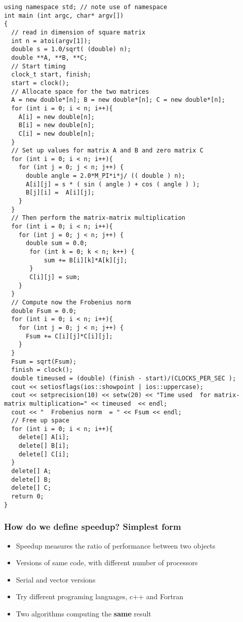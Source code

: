\documentclass{beamer}
\begin{document}
\begin{frame}
\begin{verbatim}
using namespace std; // note use of namespace
int main (int argc, char* argv[])
{
  // read in dimension of square matrix
  int n = atoi(argv[1]);
  double s = 1.0/sqrt( (double) n);
  double **A, **B, **C;
  // Start timing
  clock_t start, finish;
  start = clock();
  // Allocate space for the two matrices
  A = new double*[n]; B = new double*[n]; C = new double*[n];
  for (int i = 0; i < n; i++){
    A[i] = new double[n];
    B[i] = new double[n];
    C[i] = new double[n];
  }
  // Set up values for matrix A and B and zero matrix C
  for (int i = 0; i < n; i++){
    for (int j = 0; j < n; j++) {
      double angle = 2.0*M_PI*i*j/ (( double ) n);
      A[i][j] = s * ( sin ( angle ) + cos ( angle ) );
      B[j][i] =  A[i][j];
    }
  }
  // Then perform the matrix-matrix multiplication
  for (int i = 0; i < n; i++){
    for (int j = 0; j < n; j++) {
      double sum = 0.0;
       for (int k = 0; k < n; k++) {
           sum += B[i][k]*A[k][j];
       }
       C[i][j] = sum;
    }
  }
  // Compute now the Frobenius norm
  double Fsum = 0.0;
  for (int i = 0; i < n; i++){
    for (int j = 0; j < n; j++) {
      Fsum += C[i][j]*C[i][j];
    }
  }
  Fsum = sqrt(Fsum);
  finish = clock();
  double timeused = (double) (finish - start)/(CLOCKS_PER_SEC );
  cout << setiosflags(ios::showpoint | ios::uppercase);
  cout << setprecision(10) << setw(20) << "Time used  for matrix-matrix multiplication=" << timeused  << endl;
  cout << "  Frobenius norm  = " << Fsum << endl;
  // Free up space
  for (int i = 0; i < n; i++){
    delete[] A[i];
    delete[] B[i];
    delete[] C[i];
  }
  delete[] A;
  delete[] B;
  delete[] C;
  return 0;
}

\end{verbatim}
\end{frame}

\begin{frame}
\frametitle{How do we define speedup? Simplest form}

\begin{block}{}
\begin{itemize}
\item Speedup measures the ratio of performance between two objects

\item Versions of same code, with different number of processors

\item Serial and vector versions

\item Try different programing languages, c++ and Fortran

\item Two algorithms computing the \textbf{same} result 
\end{itemize}

\noindent
\end{block}
\end{frame}
\end{document}
